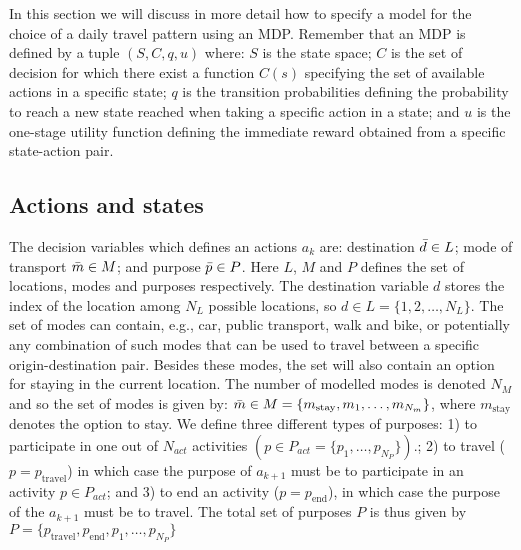 In this section we will discuss in more detail how to specify a model for the choice of a daily travel pattern using an MDP. Remember that an MDP is defined by a tuple $(S,C,q,u)$ where: $S$ is the state space; $C$ is the set of decision for which there exist a function $C(s)$ specifying the set of available actions in a specific state; $q$ is the transition probabilities defining the probability to reach a new state reached when taking a specific action in a state; and $u$ is the one-stage utility function defining the immediate reward obtained from a specific state-action pair.

\subsection{Actions and states}
The decision variables which defines an actions $a_k$ are: destination $\bar{d} \in L$; mode of transport $\bar{m} \in M$; and purpose $\bar{p} \in P$. Here $L$, $M$ and $P$ defines the set of locations, modes and purposes respectively.  The destination variable $d$ stores the index of the location among $N_L$ possible locations, so $d \in  L = \{1,2,\dots, N_L\}$. The set of modes can contain, e.g., car, public transport, walk and bike, or potentially any combination of such modes that can be used to travel between a specific origin-destination pair. Besides these modes, the set will also contain an option for staying in the current location. The number of modelled modes is denoted $N_M$ and so the set of modes is given by: $\bar{m} \in M = \{m_{\text{stay}},m_1,\dots,m_{N_m}\}$, where $m_{\text{stay}}$ denotes the option to stay. We define three different types of purposes: 1) to participate in one out of $N_{act}$ activities $(p\in P_{act} = \{p_1,\dots,p_{N_P}\})$.; 2) to travel ($p=p_{\text{travel}}$) in which case the purpose of $a_{k+1}$ must be to participate in an activity $p \in P_{act}$; and 3) to end an activity ($p=p_{\text{end}}$), in which case the purpose of the $a_{k+1}$ must be to travel. The total set of purposes $P$ is thus given by $P = \{p_{\text{travel}},p_{\text{end}},p_1,\dots,p_{N_P}\}$

